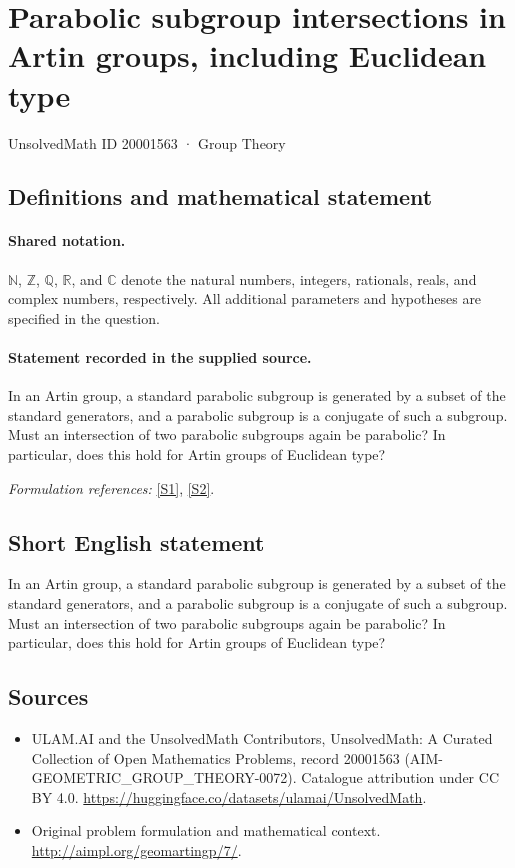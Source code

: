 \documentclass[11pt]{article}
\newcommand{\sref}[2]{\hyperlink{source:#1:#2}{[S#2]}}
\begin{document}
\setcounter{section}{20001562}
\section{Parabolic subgroup intersections in Artin groups, including Euclidean type}\label{20001563}
{\small UnsolvedMath ID 20001563 · Group Theory}
\subsection{Definitions and mathematical statement}

\paragraph{Shared notation.}$\mathbb N$, $\mathbb Z$, $\mathbb Q$, $\mathbb R$, and $\mathbb C$ denote the natural numbers, integers, rationals, reals, and complex numbers, respectively. All additional parameters and hypotheses are specified in the question.


\paragraph{Statement recorded in the supplied source.}
In an Artin group, a standard parabolic subgroup is generated by a subset of the standard generators, and a parabolic subgroup is a conjugate of such a subgroup. Must an intersection of two parabolic subgroups again be parabolic? In particular, does this hold for Artin groups of Euclidean type?
\par\smallskip\textit{Formulation references:} \sref{20001563}{1}, \sref{20001563}{2}.
\subsection{Short English statement}
In an Artin group, a standard parabolic subgroup is generated by a subset of the standard generators, and a parabolic subgroup is a conjugate of such a subgroup. Must an intersection of two parabolic subgroups again be parabolic? In particular, does this hold for Artin groups of Euclidean type?
\subsection{Sources}
\begin{itemize}
\item[\hypertarget{source:20001563:1}{S1}] ULAM.AI and the UnsolvedMath Contributors, UnsolvedMath: A Curated Collection of Open Mathematics Problems, record 20001563 (AIM-GEOMETRIC\_GROUP\_THEORY-0072). Catalogue attribution under CC BY 4.0.
\url{https://huggingface.co/datasets/ulamai/UnsolvedMath}.
\item[\hypertarget{source:20001563:2}{S2}] Original problem formulation and mathematical context.
\url{http://aimpl.org/geomartingp/7/}.
\end{itemize}
\label{end:20001563}
\end{document}
